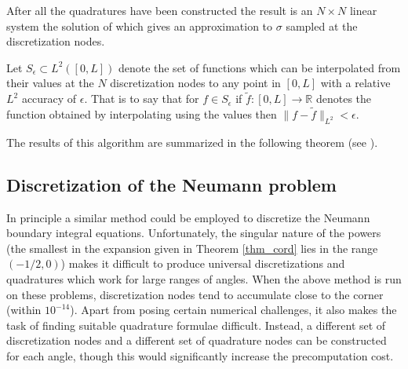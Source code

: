 After all the quadratures have been constructed the result is an $N \times N$ linear system the  solution of which gives an approximation to $\sigma$ sampled at the discretization nodes. 

\begin{definition}\label{def:seps}
Let $S_\epsilon \subset L^2([0,L])$ denote the set of functions which can be interpolated from their values at the $N$ discretization nodes to any point in $[0,L]$ with a relative $L^2$ accuracy of $\epsilon.$ That is to say that for $f \in S_\epsilon$ if $\tilde{f}:[0,L] \to \mathbb{R}$ denotes the function obtained by interpolating using the values  then $\|f -\tilde{f}\|_{L^2} < \epsilon.$ 
\end{definition}

The results of this algorithm are summarized in the following theorem (see \cite{hoskins2019numerical}).


\subsection{Discretization of the Neumann problem}
In principle a similar method could be employed to discretize the Neumann boundary integral equations. Unfortunately, the singular nature of the powers (the smallest in the expansion given in Theorem \ref{thm_cord} lies in the range $(-1/2,0)$) makes it difficult to produce universal discretizations and quadratures which work for large ranges of angles. When the above method is run on these problems, discretization nodes tend to accumulate close to the corner (within $10^{-14}$). Apart from posing certain numerical challenges, it also makes the task of finding suitable quadrature formulae difficult. Instead, a different set of discretization nodes and a different set of quadrature nodes can be constructed for each angle, though this would significantly increase the precomputation cost.

